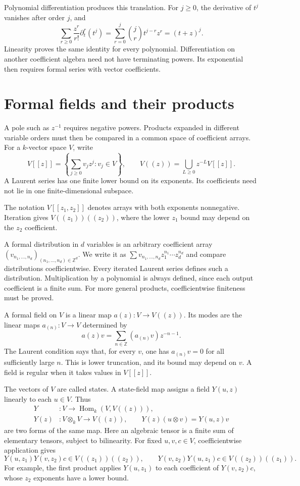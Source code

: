 Polynomial differentiation produces this translation.
For $j\geq0$, the derivative of $t^j$ vanishes after order $j$, and
\[
 \sum_{r\geq0}\frac{z^r}{r!}\partial_t^r(t^j)
   =\sum_{r=0}^j\binom jr t^{j-r}z^r=(t+z)^j.
\]
Linearity proves the same identity for every polynomial.
Differentiation on another coefficient algebra need not have terminating powers.
Its exponential then requires formal series with vector coefficients.

\section{Formal fields and their products}
\label{sec:vertex-formal-carriers}

A pole such as $z^{-1}$ requires negative powers.
Products expanded in different variable orders must then be compared
in a common space of coefficient arrays.
For a $k$-vector space $V$, write
\[
 V[[z]]=\left\{\sum_{j\geq0}v_jz^j:v_j\in V\right\},\qquad
 V((z))=\bigcup_{L\geq0}z^{-L}V[[z]].
\]
A Laurent series has one finite lower bound on its exponents.
Its coefficients need not lie in one finite-dimensional subspace.

The notation $V[[z_1,z_2]]$ denotes arrays with both exponents
nonnegative. Iteration gives $V((z_1))((z_2))$, where the lower
$z_1$ bound may depend on the $z_2$ coefficient.

A formal distribution in $d$ variables is an arbitrary coefficient
array $(v_{n_1,\ldots,n_d})_{(n_1,\ldots,n_d)\in\mathbb Z^d}$.
We write it as $\sum v_{n_1,\ldots,n_d}z_1^{n_1}\cdots z_d^{n_d}$
and compare distributions coefficientwise.
Every iterated Laurent series defines such a distribution.
Multiplication by a polynomial is always defined, since each output
coefficient is a finite sum.
For more general products, coefficientwise finiteness must be proved.

A formal field on $V$ is a linear map $a(z):V\to V((z))$.
Its modes are the linear maps $a_{(n)}:V\to V$ determined by
\[
 a(z)v=\sum_{n\in\mathbb Z}(a_{(n)}v)z^{-n-1}.
\]
The Laurent condition says that, for every $v$, one has
$a_{(n)}v=0$ for all sufficiently large $n$.
This is lower truncation, and its bound may depend on $v$.
A field is regular when it takes values in $V[[z]]$.

The vectors of $V$ are called states.
A state-field map assigns a field $Y(u,z)$ linearly to each $u\in V$.
Thus
\[
 \begin{aligned}
 Y&:V\longrightarrow\operatorname{Hom}_k(V,V((z))),\\
 Y(z)&:V\otimes_kV\longrightarrow V((z)),\qquad
 Y(z)(u\otimes v)=Y(u,z)v
 \end{aligned}
\]
are two forms of the same map.
Here an algebraic tensor is a finite sum of elementary tensors,
subject to bilinearity.
For fixed $u,v,c\in V$, coefficientwise application gives
\[
 Y(u,z_1)Y(v,z_2)c\in V((z_1))((z_2)),\qquad
 Y(v,z_2)Y(u,z_1)c\in V((z_2))((z_1)).
\]
For example, the first product applies $Y(u,z_1)$ to each coefficient
of $Y(v,z_2)c$, whose $z_2$ exponents have a lower bound.

